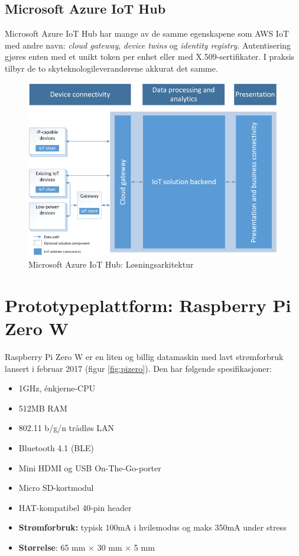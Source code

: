 \subsection{Microsoft Azure IoT Hub}
Microsoft Azure IoT Hub har mange av de samme egenskapene som AWS IoT med andre navn: \textit{cloud gateway},
\textit{device twins} og \textit{identity registry}. Autentisering gjøres enten med et unikt token per enhet eller med
X.509-sertifikater. I praksis tilbyr de to skyteknologileverandørene akkurat det samme.

\begin{figure}
\includegraphics[width=1.0\textwidth,center]{fig/iot-reference-architecture}
\caption{Microsoft Azure IoT Hub: Løsningsarkitektur} %
\label{fig:azure_iot}
\end{figure}


\section{Prototypeplattform: Raspberry Pi Zero W}
Raspberry Pi Zero W er en liten og billig datamaskin med lavt strømforbruk lansert i februar 2017 (figur \ref{fig:pizero}).
Den har følgende spesifikasjoner: %
\begin{itemize}
    \item 1GHz, énkjerne-CPU
    \item 512MB RAM
    \item 802.11 b/g/n trådløs LAN
    \item Bluetooth 4.1 (BLE)
    \item Mini HDMI og USB On-The-Go-porter
    \item Micro SD-kortmodul
    \item HAT-kompatibel 40-pin header
    \item \textbf{Strømforbruk:} typisk 100mA i hvilemodus og maks 350mA under stress
    \item \textbf{Størrelse}: 65 mm × 30 mm × 5 mm
\end{itemize}

